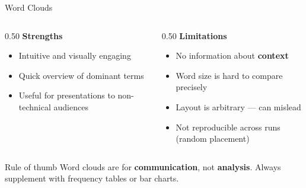 \documentclass[aspectratio=169]{beamer}
\begin{document}
\begin{frame}{Word Clouds}
    \begin{columns}[T]
        \begin{column}{0.50\textwidth}
            \textbf{\color{sgsssGreen} Strengths}
            \begin{itemize}
                \item {} Intuitive and visually engaging
                \item Quick overview of dominant terms
                \item Useful for presentations to non-technical audiences
            \end{itemize}
        \end{column}
        \begin{column}{0.50\textwidth}
            \textbf{\color{sgsssMagenta} Limitations}
            \begin{itemize}
                \item {} No information about \textbf{context}
                \item Word size is hard to compare precisely
                \item Layout is arbitrary --- can mislead
                \item Not reproducible across runs (random placement)
            \end{itemize}
        \end{column}
    \end{columns}

    \vspace{0.4cm}
    \begin{alertblock}{Rule of thumb}
        Word clouds are for \textbf{communication}, not \textbf{analysis}. Always supplement with frequency tables or bar charts.
    \end{alertblock}
\end{frame}
\end{document}
